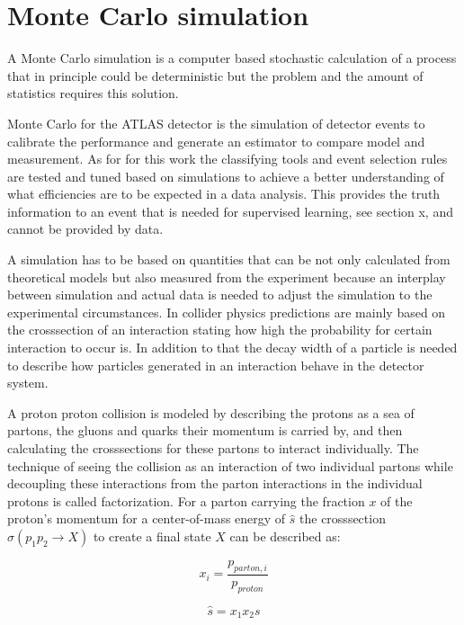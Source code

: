 \section{Monte Carlo simulation}

A Monte Carlo simulation is a computer based stochastic calculation of a process that in principle could be deterministic but the problem and the amount of statistics requires this solution.

Monte Carlo for the ATLAS detector is the simulation of detector events to calibrate the performance and generate an estimator to compare model and measurement. As for for this work the classifying tools and event selection rules are tested and tuned based on simulations to achieve a better understanding of what efficiencies are to be expected in a data analysis. This provides the truth information to an event that is needed for supervised learning, see section x, and cannot be provided by data.

A simulation has to be based on quantities that can be not only calculated from theoretical models but also measured from the experiment because an interplay between simulation and actual data is needed to adjust the simulation to the experimental circumstances. In collider physics predictions are mainly based on  the crosssection of an interaction stating how high the probability for certain interaction to occur is. In addition to that the decay width of a particle is needed to describe how particles generated in an interaction behave in the detector system.

A proton proton collision is modeled by describing the protons as a sea of partons, the gluons and quarks their momentum is carried by, and then calculating the crosssections for these partons to interact individually. The technique of seeing the collision as an interaction of two individual partons while decoupling these interactions from the parton interactions in the individual protons is called factorization.
For a parton carrying the fraction $x$ of the proton's momentum for a center-of-mass energy of $\hat{s}$  the crosssection $\sigma(p_1 p_2 \rightarrow X)$ to create a final state $X$ can be described as:


\noindent\begin{minipage}{.5\linewidth}
\begin{equation}
	x_i = \frac{p_{parton,i}}{p_{proton}} 
\end{equation}
\end{minipage}%
\begin{minipage}{.5\linewidth}
\begin{equation}
	\hat{s} = x_1 x_2 s
\end{equation}
\end{minipage}

